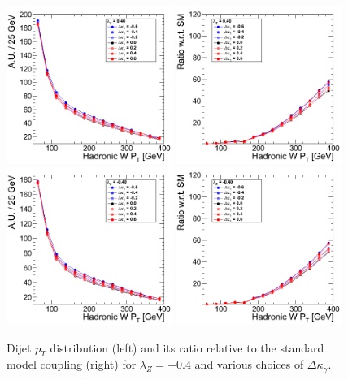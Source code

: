 \begin{figure}[h!t]
  {\centering
    \includegraphics[width=0.48\textwidth]{figs/HadronicWpT_040.png}
    \includegraphics[width=0.48\textwidth]{figs/HadronicWpT_040_ratio.png}
    \includegraphics[width=0.48\textwidth]{figs/HadronicWpT_m040.png}
    \includegraphics[width=0.48\textwidth]{figs/HadronicWpT_m040_ratio.png}
    \caption{Dijet $p_T$ distribution (left) and its ratio relative to 
    the standard model coupling (right) for $\lambda_Z = \pm 0.4$ and various choices of $\Delta{\kappa_\gamma}$.}
    \label{fig:ww_dijetPt_atgcRatio04}}
\end{figure}
